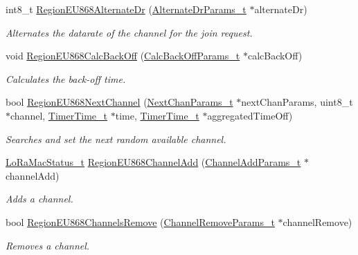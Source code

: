 \begin{DoxyCompactItemize}
int8\+\_\+t \hyperlink{group__REGIONEU868_ga7aa17730c097b5233f1d8d6bde238923}{Region\+E\+U868\+Alternate\+Dr} (\hyperlink{group__REGION_ga001ea4338d1c83f4c785b49d7ad2d696}{Alternate\+Dr\+Params\+\_\+t} $\ast$alternate\+Dr)
\begin{DoxyCompactList}\small\item\em Alternates the datarate of the channel for the join request. \end{DoxyCompactList}\item 
void \hyperlink{group__REGIONEU868_ga0900ea63994bf51a3ee43bd4917e5647}{Region\+E\+U868\+Calc\+Back\+Off} (\hyperlink{group__REGION_ga7c5c9a8da174e6679eded8257dc92fd9}{Calc\+Back\+Off\+Params\+\_\+t} $\ast$calc\+Back\+Off)
\begin{DoxyCompactList}\small\item\em Calculates the back-\/off time. \end{DoxyCompactList}\item 
bool \hyperlink{group__REGIONEU868_gaa219af9d7f0ceea1378ecd88fd198a95}{Region\+E\+U868\+Next\+Channel} (\hyperlink{group__REGION_ga115f5e83afae352c0a3dcdc193374040}{Next\+Chan\+Params\+\_\+t} $\ast$next\+Chan\+Params, uint8\+\_\+t $\ast$channel, \hyperlink{utilities_8h_a4215ca43d3e953099ea758ce428599d0}{Timer\+Time\+\_\+t} $\ast$time, \hyperlink{utilities_8h_a4215ca43d3e953099ea758ce428599d0}{Timer\+Time\+\_\+t} $\ast$aggregated\+Time\+Off)
\begin{DoxyCompactList}\small\item\em Searches and set the next random available channel. \end{DoxyCompactList}\item 
\hyperlink{group__LORAMAC_ga30bd25657e10480f8605ee951b0ecfbd}{Lo\+Ra\+Mac\+Status\+\_\+t} \hyperlink{group__REGIONEU868_gaa51182eab8774612408fd0ea8f89f63b}{Region\+E\+U868\+Channel\+Add} (\hyperlink{group__REGION_gab1c5f3aa06614283202906cef4417860}{Channel\+Add\+Params\+\_\+t} $\ast$channel\+Add)
\begin{DoxyCompactList}\small\item\em Adds a channel. \end{DoxyCompactList}\item 
bool \hyperlink{group__REGIONEU868_gac30e0032ee1e6f09d4ee032e7169e238}{Region\+E\+U868\+Channels\+Remove} (\hyperlink{group__REGION_gaa37468560d2fc81a977b57a48e5d72c0}{Channel\+Remove\+Params\+\_\+t} $\ast$channel\+Remove)
\begin{DoxyCompactList}\small\item\em Removes a channel. \end{DoxyCompactList}\item 

\end{DoxyCompactItemize}
